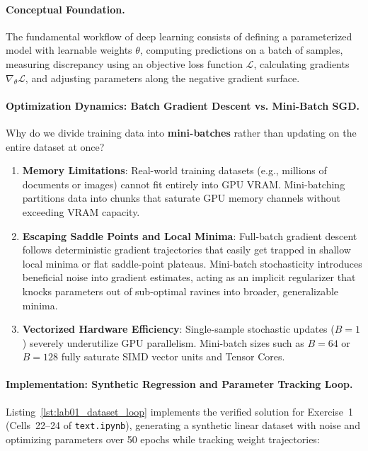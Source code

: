 \documentclass[11pt,a4paper]{article}
\begin{document}
\paragraph{Conceptual Foundation.}
The fundamental workflow of deep learning consists of defining a parameterized model with learnable weights $\theta$, computing predictions on a batch of samples, measuring discrepancy using an objective loss function $\mathcal{L}$, calculating gradients $\nabla_\theta \mathcal{L}$, and adjusting parameters along the negative gradient surface.

\paragraph{Optimization Dynamics: Batch Gradient Descent vs. Mini-Batch SGD.}
Why do we divide training data into \textbf{mini-batches} rather than updating on the entire dataset at once?

\begin{enumerate}
    \item \textbf{Memory Limitations}: Real-world training datasets (e.g., millions of documents or images) cannot fit entirely into GPU VRAM. Mini-batching partitions data into chunks that saturate GPU memory channels without exceeding VRAM capacity.
    \item \textbf{Escaping Saddle Points and Local Minima}: Full-batch gradient descent follows deterministic gradient trajectories that easily get trapped in shallow local minima or flat saddle-point plateaus. Mini-batch stochasticity introduces beneficial noise into gradient estimates, acting as an implicit regularizer that knocks parameters out of sub-optimal ravines into broader, generalizable minima.
    \item \textbf{Vectorized Hardware Efficiency}: Single-sample stochastic updates ($B=1$) severely underutilize GPU parallelism. Mini-batch sizes such as $B=64$ or $B=128$ fully saturate SIMD vector units and Tensor Cores.
\end{enumerate}

\paragraph{Implementation: Synthetic Regression and Parameter Tracking Loop.}

Listing~\ref{lst:lab01_dataset_loop} implements the verified solution for Exercise~1 (Cells~22--24 of \texttt{text.ipynb}), generating a synthetic linear dataset with noise and optimizing parameters over 50 epochs while tracking weight trajectories:
\end{document}
